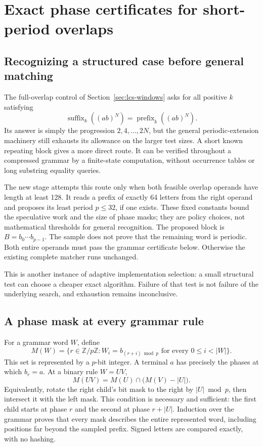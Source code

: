 \section{Exact phase certificates for short-period overlaps}
\label{sec:lcs-periodic}

\subsection{Recognizing a structured case before general matching}

The full-overlap control of Section~\ref{sec:lcs-windows} asks for all
positive $k$ satisfying
\[
 \operatorname{suffix}_k((ab)^N)=\operatorname{prefix}_k((ab)^N).
\]
Its answer is simply the progression
$2,4,\ldots,2N$, but the general periodic-extension machinery still
exhausts its allowance on the larger test sizes. A short known repeating
block gives a more direct route. It can be verified throughout a compressed
grammar by a finite-state computation, without occurrence tables or long
substring equality queries.

The new stage attempts this route only when both feasible overlap operands
have length at least 128. It reads a prefix of exactly 64 letters from the
right operand and proposes its least period $p\le32$, if one exists.
These fixed constants bound the speculative work and the size of phase
masks; they are policy choices, not mathematical thresholds for general
recognition. The proposed block is $B=b_0\cdots b_{p-1}$.
The sample does not prove that the remaining word is periodic. Both entire
operands must pass the grammar certificate below. Otherwise the existing
complete matcher runs unchanged.

This is another instance of adaptive implementation selection: a small
structural test can choose a cheaper exact algorithm. Failure of that test
is not failure of the underlying search, and exhaustion remains inconclusive.

\subsection{A phase mask at every grammar rule}

For a grammar word $W$, define
\[
 M(W)=\{r\in\mathbb Z/p\mathbb Z:
          W_i=b_{(r+i)\bmod p}\text{ for every }0\le i<|W|\}.
\]
This set is represented by a $p$-bit integer. A terminal $a$ has precisely
the phases at which $b_r=a$. At a binary rule $W=UV$,
\[
 M(UV)=M(U)\cap\bigl(M(V)-|U|\bigr).
\]
Equivalently, rotate the right child's bit mask to the right by
$|U|\bmod p$, then intersect it with the left mask. This condition is
necessary and sufficient: the first child starts at phase $r$ and the
second at phase $r+|U|$. Induction over the grammar proves that every
mask describes the entire represented word, including positions far beyond
the sampled prefix. Signed letters are compared exactly, with no hashing.

